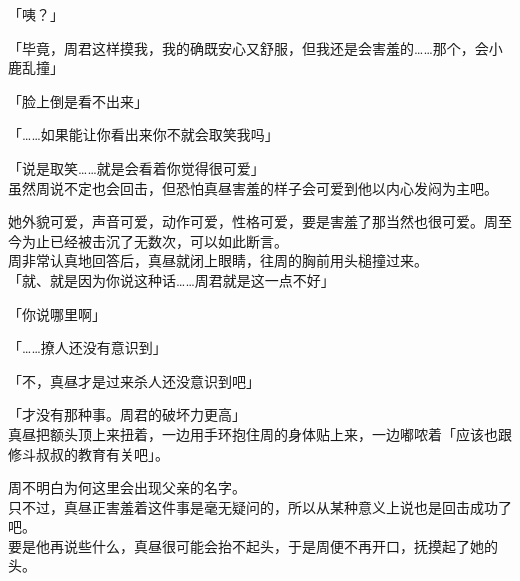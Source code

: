 「咦？」

「毕竟，周君这样摸我，我的确既安心又舒服，但我还是会害羞的……那个，会小鹿乱撞」

「脸上倒是看不出来」

「……如果能让你看出来你不就会取笑我吗」

「说是取笑……就是会看着你觉得很可爱」\\

虽然周说不定也会回击，但恐怕真昼害羞的样子会可爱到他以内心发闷为主吧。

她外貌可爱，声音可爱，动作可爱，性格可爱，要是害羞了那当然也很可爱。周至今为止已经被击沉了无数次，可以如此断言。\\

周非常认真地回答后，真昼就闭上眼睛，往周的胸前用头槌撞过来。\\

「就、就是因为你说这种话……周君就是这一点不好」

「你说哪里啊」

「……撩人还没有意识到」

「不，真昼才是过来杀人还没意识到吧」

「才没有那种事。周君的破坏力更高」\\

真昼把额头顶上来扭着，一边用手环抱住周的身体贴上来，一边嘟哝着「应该也跟修斗叔叔的教育有关吧」。

周不明白为何这里会出现父亲的名字。\\

只不过，真昼正害羞着这件事是毫无疑问的，所以从某种意义上说也是回击成功了吧。\\

要是他再说些什么，真昼很可能会抬不起头，于是周便不再开口，抚摸起了她的头。
